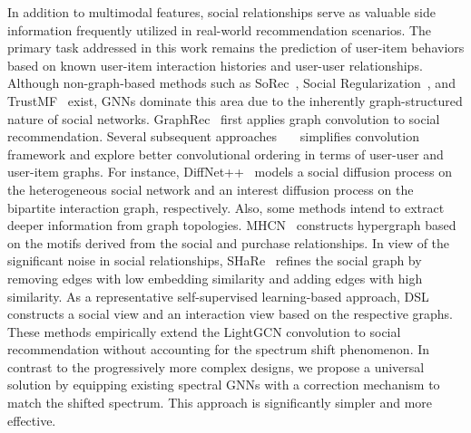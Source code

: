 In addition to multimodal features, social relationships serve as valuable side information frequently utilized in real-world recommendation scenarios. 
The primary task addressed in this work remains the prediction of user-item behaviors based on known user-item interaction histories and user-user relationships. 
Although non-graph-based methods such as SoRec~\cite{ma2008sorec}, Social Regularization~\cite{ma2011socreg}, and TrustMF~\cite{liu2013trustmf} exist, 
GNNs dominate this area due to the inherently graph-structured nature of social networks.
GraphRec~\cite{fan2019graphrec} first applies graph convolution to social recommendation.
Several subsequent approaches~\cite{liao2022sociallgn}~\cite{huang2021kgcn}~\cite{long2021smin} simplifies convolution framework and explore better convolutional ordering in terms of user-user and user-item graphs.
For instance, DiffNet++~\cite{wu2020diffnet++} models a social diffusion process on the heterogeneous social network
and an interest diffusion process on the bipartite interaction graph, respectively.
Also, some methods intend to extract deeper information from graph topologies.
MHCN~\cite{yu2021mhcn} constructs hypergraph based on the motifs derived from the social and purchase relationships.
In view of the significant noise in social relationships, 
SHaRe~\cite{jiang2024share} refines the social graph by removing edges with low embedding similarity and adding edges with high similarity. 
As a representative self-supervised learning-based approach, 
DSL~\cite{wang2023dsl} constructs a social view and an interaction view based on the respective graphs. 
These methods empirically extend the LightGCN convolution to social recommendation without accounting for the spectrum shift phenomenon.
In contrast to the progressively more complex designs, 
we propose a universal solution by equipping existing spectral GNNs with a correction mechanism to match the shifted spectrum. 
This approach is significantly simpler and more effective.